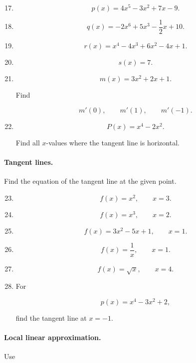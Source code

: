 \begin{enumerate}
\setcounter{enumi}{16}

\item
\[
p(x)=4x^5-3x^2+7x-9.
\]

\item
\[
q(x)=-2x^6+5x^3-\frac12x+10.
\]

\item
\[
r(x)=x^4-4x^3+6x^2-4x+1.
\]

\item
\[
s(x)=7.
\]

\item
\[
m(x)=3x^2+2x+1.
\]

Find

\[
m'(0),\qquad m'(1),\qquad m'(-1).
\]

\item
\[
P(x)=x^4-2x^2.
\]

Find all \(x\)-values where the tangent line is horizontal.
\end{enumerate}

\paragraph{Tangent lines.}
Find the equation of the tangent line at the given point.

\begin{enumerate}
\setcounter{enumi}{22}

\item
\[
f(x)=x^2,\qquad x=3.
\]

\item
\[
f(x)=x^3,\qquad x=2.
\]

\item
\[
f(x)=3x^2-5x+1,\qquad x=1.
\]

\item
\[
f(x)=\frac1x,\qquad x=1.
\]

\item
\[
f(x)=\sqrt{x},\qquad x=4.
\]

\item
For

\[
p(x)=x^4-3x^2+2,
\]

find the tangent line at \(x=-1\).
\end{enumerate}

\paragraph{Local linear approximation.}
Use

